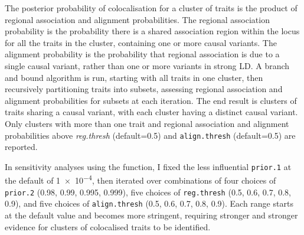 The posterior probability of colocalisation for a cluster of traits is the product of regional association and alignment probabilities.
The regional association probability is the probability there is a shared association region within the locus for all the traits in the cluster, containing one or more causal variants.
The alignment probability is the probability that regional association is due to a single causal variant, rather than one or more variants in strong \gls{LD}. 
A branch and bound algorithm is run, starting with all traits in one cluster,
then recursively partitioning traits into subsets, assessing regional association and alignment probabilities for subsets at each iteration.
The end result is clusters of traits sharing a causal variant, with each cluster having a distinct causal variant.
Only clusters with more than one trait and regional association and alignment probabilities above \textit{reg.thresh} (default=0.5) and \texttt{align.thresh} (default=0.5) are reported.

In sensitivity analyses using the  function,
I fixed the less influential \texttt{prior.1} at the default of \num{1e-4}, 
then iterated over combinations of
four choices of \texttt{prior.2} (0.98, 0.99, 0.995, 0.999),
five choices of \texttt{reg.thresh} (0.5, 0.6, 0.7, 0.8, 0.9),
and five choices of \texttt{align.thresh} (0.5, 0.6, 0.7, 0.8, 0.9).
Each range starts at the default value and becomes more stringent, 
requiring stronger and stronger evidence for clusters of colocalised traits to be identified.

